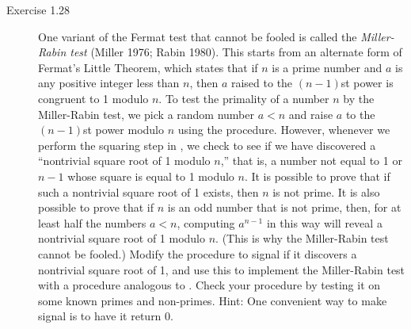 \begin{description}
\item[Exercise 1.28] One variant of the Fermat test that cannot be fooled is called the \emph{Miller-Rabin test} (Miller 1976; Rabin 1980). This starts from an alternate form of Fermat's Little Theorem, which states that if $n$ is a prime number and $a$ is any positive integer less than $n$, then $a$ raised to the $(n - 1)$st power is congruent to 1 modulo $n$. To test the primality of a number $n$ by the Miller-Rabin test, we pick a random number $a < n$ and raise $a$ to the $(n - 1)$st power modulo $n$ using the  procedure. However, whenever we perform the squaring step in , we check to see if we have discovered a ``nontrivial square root of 1 modulo $n$,'' that is, a number not equal to 1 or $n - 1$ whose square is equal to 1 modulo $n$. It is possible to prove that if such a nontrivial square root of 1 exists, then $n$ is not prime. It is also possible to prove that if $n$ is an odd number that is not prime, then, for at least half the numbers $a < n$, computing $a^{n-1}$ in this way will reveal a nontrivial square root of 1 modulo $n$. (This is why the Miller-Rabin test cannot be fooled.) Modify the  procedure to signal if it discovers a nontrivial square root of 1, and use this to implement the Miller-Rabin test with a procedure analogous to . Check your procedure by testing it on some known primes and non-primes. Hint: One convenient way to make  signal is to have it return 0.
\end{description}